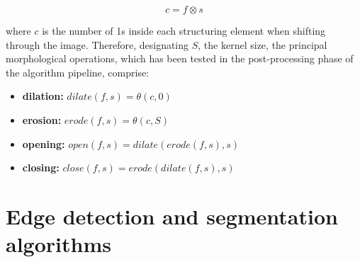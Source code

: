 \begin{equation}
	\label{eqn:morph-convol}
	c = f \otimes s
\end{equation}

where $c$ is the number of 1s inside each structuring element when shifting through the image.
Therefore, designating $S$, the kernel size, the principal morphological operations, which has been tested in the post-processing phase of the algorithm pipeline, comprise:
\begin{itemize}
	\item \textbf{dilation: } $\mathit{dilate}(f,s) = \theta(c, 0)$
	\item \textbf{erosion: } $\mathit{erode}(f,s) = \theta(c, S)$
	\item \textbf{opening: } $\mathit{open}(f,s) = \mathit{dilate}(\mathit{erode}(f, s), s)$
	\item \textbf{closing: } $\mathit{close}(f,s) = \mathit{erode}(\mathit{dilate}(f, s), s)$
\end{itemize}

\section{Edge detection and segmentation algorithms}
\label{section:edge-detect}


